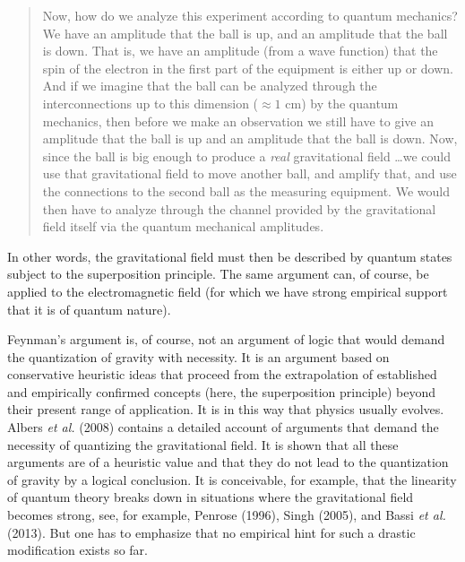 \documentclass[12pt,a4paper]{article}
\begin{document}
\begin{quote}
Now, how do we analyze this experiment according to quantum mechanics?
We have an amplitude that the ball is up, and an amplitude that the
ball is down. That is, we have an amplitude (from a wave function)
that the spin of the electron in the first part of the equipment is
either up or down. And if we imagine that the ball can be analyzed
through the interconnections up to this dimension ($\approx 1$ cm) by
the quantum mechanics, then before we make an observation we still
have to give an amplitude that the ball is up and an amplitude that
the ball is down. Now, since the ball is big enough to produce a {\em
  real} gravitational field \ldots we could use that gravitational
field to move another ball, and amplify that, and use the connections
to the second ball as the measuring equipment. We would then have to
analyze through the channel provided by the gravitational field itself
via the quantum mechanical amplitudes.
\end{quote}

In other words, the gravitational field must then be described by
quantum states subject to the superposition principle. The same
argument can, of course, be applied to the electromagnetic field (for
which we have strong empirical support that it is of quantum nature). 

Feynman's argument is, of course, not an argument of logic that would
demand the quantization of gravity with necessity. It is an argument
based on conservative heuristic ideas that proceed from the
extrapolation of established and empirically confirmed concepts (here,
the superposition principle) beyond their present range of
application. It is in this way that physics usually evolves. 
Albers {\em et al.} (2008) contains a detailed account of arguments
that demand the necessity of quantizing the gravitational field. It is
shown that all these arguments are of a heuristic value and that they do not
lead to the quantization of gravity by a logical conclusion. It is
conceivable, for example, that the linearity of quantum theory breaks
down in situations where the gravitational field becomes strong, see,
for example, Penrose (1996), Singh (2005), and Bassi {\em et al.}
(2013). But one has to emphasize 
that no empirical hint for such a drastic modification exists so far. 
\end{document}

